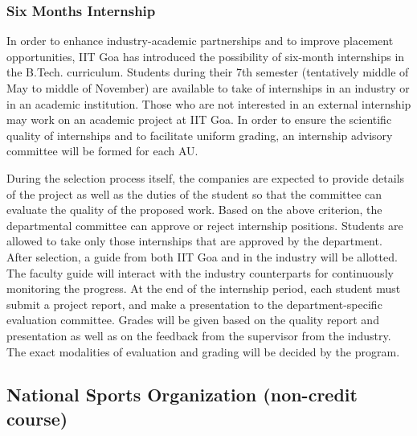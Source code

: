 \subsubsection{Six Months Internship}

In order to enhance industry-academic partnerships and to improve placement opportunities, IIT Goa has introduced the possibility of six-month internships in the B.Tech. curriculum. Students during their 7th semester (tentatively middle of May to middle of November) are available to take of internships in an industry or in an academic institution. Those who are not interested in an external internship may work on an academic project at IIT Goa. In order to ensure the scientific quality of internships and to facilitate uniform grading, an internship advisory committee will be formed for each AU.

During the selection process itself, the companies are expected to provide details of the project as well as the duties of the student so that the committee can evaluate the quality of the proposed work. Based on the above criterion, the departmental committee can approve or reject internship positions. Students are allowed to take only those internships that are approved by the department. After selection, a guide from both IIT Goa and in the industry will be allotted. The faculty guide will interact with the industry counterparts for continuously monitoring the progress. At the end of the internship period, each student must submit a project report, and make a presentation to the department-specific evaluation committee. Grades will be given based on the quality report and presentation as well as on the feedback from the supervisor from the industry. The exact modalities of evaluation and grading will be decided by the program.

\subsection{National Sports Organization (non-credit course)}

